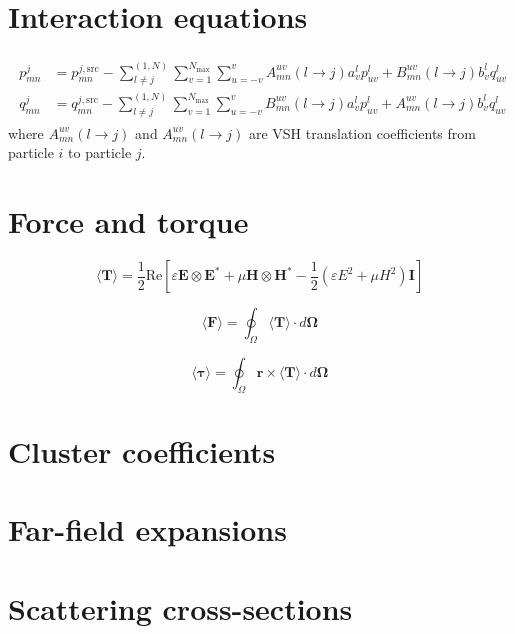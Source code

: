 \documentclass[11pt]{article}
\begin{document}
\section{Interaction equations}
\begin{align}
    \begin{split}
        p_{mn}^j &= p_{mn}^{j,\text{src}}  -  \sum_{l \neq j}^{(1,N)}\sum_{v=1}^{N_\text{max}} \sum_{u=-v}^{v}
    A_{mn}^{uv}(l \rightarrow j) a_v^l p_{uv}^{l}
    +B_{mn}^{uv}(l \rightarrow j) b_v^l q_{uv}^{l} \\
    q_{mn}^j &= q_{mn}^{j,\text{src}}  -  \sum_{l \neq j}^{(1,N)}\sum_{v=1}^{N_\text{max}} \sum_{u=-v}^{v}
    B_{mn}^{uv}(l \rightarrow j) a_v^l p_{uv}^{l}
    +A_{mn}^{uv}(l \rightarrow j) b_v^l q_{uv}^{l}
    \label{eqn:gmt_system}
    \end{split}
\end{align}
where $A_{mn}^{uv}(l \rightarrow j)$ and $A_{mn}^{uv}(l \rightarrow j)$ are VSH translation coefficients from particle $i$ to particle $j$.

\section{Force and torque}
\begin{equation}
    \langle \boldsymbol{T} \rangle = \frac{1}{2} \text{Re} \left[ \varepsilon  \boldsymbol{E} \otimes \boldsymbol{E^*} + \mu \boldsymbol{H} \otimes \boldsymbol{H^*}
    - \frac{1}{2}(\varepsilon E^2 + \mu H^2)\boldsymbol{I} \right]
\end{equation}

\begin{equation}
    \langle \boldsymbol{F} \rangle = \oint_\Omega \langle \boldsymbol{T} \rangle \cdot d \boldsymbol{\Omega}
\end{equation}

\begin{equation}
    \langle \boldsymbol{\tau} \rangle = \oint_\Omega \boldsymbol{r} \times \langle \boldsymbol{T}  \rangle \cdot d \boldsymbol{\Omega}
\end{equation}

\section{Cluster coefficients}
\section{Far-field expansions}
\section{Scattering cross-sections}
\end{document}
